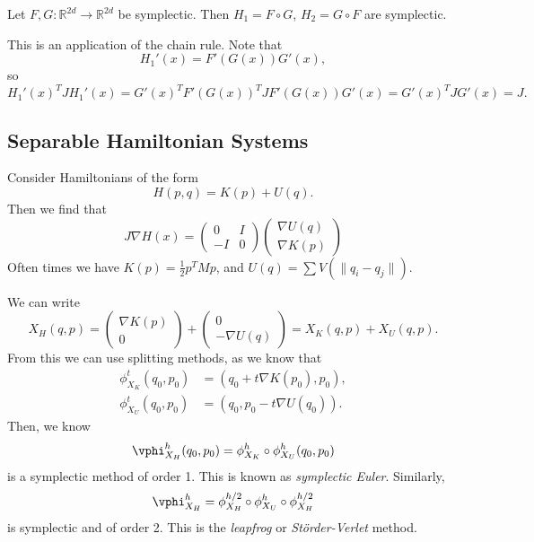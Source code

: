 \documentclass[12pt]{article}
\begin{document}
\begin{lemma}
	Let $F, G : \mathbb{R}^{2d} \to \mathbb{R}^{2d}$ be symplectic. Then $H_1 = F \circ G$, $H_2 = G \circ F$ are symplectic.
\end{lemma}

\begin{proofbox}
	This is an application of the chain rule. Note that
	\[
	H_1'(x) = F'(G(x)) G'(x),
	\]
	so
	\[
	H_1'(x)^{T} J H_1'(x) = G'(x)^{T} F'(G(x))^{T} J F'(G(x)) G'(x) = G'(x)^{T} J G'(x) = J.
	\]
\end{proofbox}

\subsection{Separable Hamiltonian Systems}%
\label{sub:shs}

Consider Hamiltonians of the form
\[
H(p, q) = K(p) + U(q).
\]
Then we find that
\[
J \nabla H(x) =
\begin{pmatrix}
	0 & I \\ -I & 0
\end{pmatrix}
\begin{pmatrix}
	\nabla U(q) \\ \nabla K(p)
\end{pmatrix}
\]
Often times we have $K(p) = \frac 12 p^{T} M p$, and $U(q) = \sum V(\|q_i - q_j\|)$.

We can write
\[
X_H(q, p) =
\begin{pmatrix}
	\nabla K(p) \\ 0
\end{pmatrix}
+
\begin{pmatrix}
	0 \\ - \nabla U(q)
\end{pmatrix}
= X_K(q, p) + X_U(q, p).
\]
From this we can use splitting methods, as we know that
\begin{align*}
	\phi_{X_K}^{t}(q_0, p_0) &= (q_0 + t \nabla K(p_0), p_0), \\
	\phi_{X_U}^{t}(q_0, p_0) &= (q_0, p_0 - t \nabla U(q_0)).
\end{align*}
Then, we know
\[
\vphi_{X_H}^{h}(q_0, p_0) = \phi_{X_K}^{h} \circ \phi_{X_U}^{h}(q_0, p_0)
\]
is a symplectic method of order 1. This is known as \emph{symplectic Euler}. Similarly,
\[
\vphi_{X_H}^{h} = \phi_{X_H}^{h/2} \circ \phi_{X_U}^{h} \circ \phi_{X_H}^{h/2}
\]
is symplectic and of order 2. This is the \emph{leapfrog} or \emph{St\"order-Verlet} method.
\end{document}
